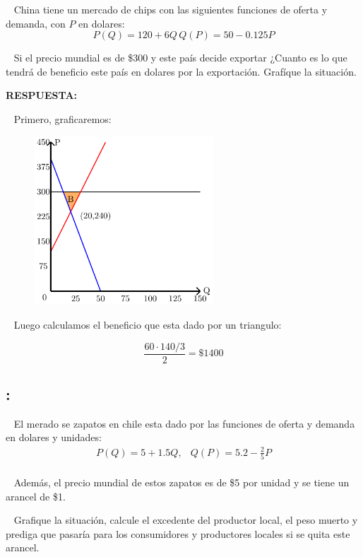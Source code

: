 \documentclass[
  letterpaper,
  DIV=11,
  numbers=noendperiod]{scrreport}
\begin{document}
~ China tiene un mercado de chips con las siguientes funciones de oferta
y demanda, con \(P\) en dolares: \[
P(Q)=120+6Q \, Q(P)=50-0.125P
\]

~ Si el precio mundial es de \$300 y este país decide exportar ¿Cuanto
es lo que tendrá de beneficio este país en dolares por la exportación.
Grafíque la situación.

\textbf{RESPUESTA:}

~ Primero, graficaremos:

\begin{figure}

{\centering \includegraphics[width=0.6\textwidth,height=\textheight]{8ej_pauta_files/figure-pdf/unnamed-chunk-13-1.pdf}

}

\end{figure}

~ Luego calculamos el beneficio que esta dado por un triangulo:

\[
\frac{60\cdot 140/3}{2}=\$1400
\]

\hypertarget{section-33}{%
\subsection{:}\label{section-33}}

~ El merado se zapatos en chile esta dado por las funciones de oferta y
demanda en dolares y unidades: \[
\begin{array}{cc}P(Q)=5+1.5Q, & Q(P)=5.2-\frac{2}{5}P\\\end{array}
\]

~ Además, el precio mundial de estos zapatos es de \$5 por unidad y se
tiene un arancel de \$1.

~ Grafique la situación, calcule el excedente del productor local, el
peso muerto y prediga que pasaría para los consumidores y productores
locales si se quita este arancel.
\end{document}
